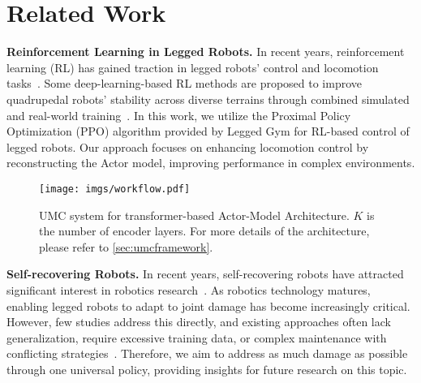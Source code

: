 \section{Related Work}
\label{sec:relworks}

\textbf{Reinforcement Learning in Legged Robots.}
In recent years, reinforcement learning (RL) has gained traction in legged robots' control and locomotion tasks~\cite{strudel2020learningcombineprimitiveskills, tang2020learningagilelocomotionadversarial}. Some deep-learning-based RL methods are proposed to improve quadrupedal robots' stability across diverse terrains through combined simulated and real-world training~\cite{A2022ReinforcementLB}. In this work, we utilize the Proximal Policy Optimization (PPO) algorithm provided by Legged Gym for RL-based control of legged robots. Our approach focuses on enhancing locomotion control by reconstructing the Actor model, improving performance in complex environments.

\begin{figure*}
  \centering
  \texttt{[image: imgs/workflow.pdf]}
  \vspace{-2mm}
  \caption{UMC system for transformer-based Actor-Model Architecture. \( K \) is the number of encoder layers. For more details of the architecture, please refer to \cref{sec:umcframework}.}
  \vspace{-5mm}
  \label{fig:trf_model}
\end{figure*}


\textbf{Self-recovering Robots.}
In recent years, self-recovering robots have attracted significant interest in robotics research~\cite{1044017, Guan2015FaultSF, 9249654}. As robotics technology matures, enabling legged robots to adapt to joint damage has become increasingly critical. However, few studies address this directly, and existing approaches often lack generalization, require excessive training data, or complex maintenance with conflicting strategies~\cite{kume2017mapbasedmultipolicyreinforcementlearning, nagabandi2019learningadaptdynamicrealworld, raileanu2020fastadaptationpolicydynamicsvalue, YangGANARL, ChenFADM, guo2023decentralizedmotorskilllearning}. Therefore, we aim to address as much damage as possible through one universal policy, providing insights for future research on this topic.


